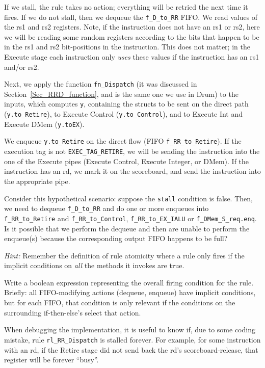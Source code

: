 If we stall, the rule takes no action; everything will be retried the
next time it fires.  If we do not stall, then we dequeue the
\verb|f_D_to_RR| FIFO.  We read values of the rs1 and rs2 registers.
Note, if the instruction does not have an rs1 or rs2, here we will be
reading some random registers according to the bits that happen to be
in the rs1 and rs2 bit-positions in the instruction.  This does not
matter; in the Execute stage each instruction only \emph{uses} these
values if the instruction has an rs1 and/or rs2.

Next, we apply the function \verb|fn_Dispatch| (it was discussed in
Section~\ref{Sec_RRD_function}, and is the same one we use in Drum) to
the inputs, which computes \verb|y|, containing the structs to be sent
on the direct path (\verb|y.to_Retire|), to Execute Control
(\verb|y.to_Control|), and to Execute Int and Execute DMem
(\verb|y.toEX|).

We enqueue \verb|y.to_Retire| on the direct flow (FIFO
\verb|f_RR_to_Retire|).  If the execution tag is not
\verb|EXEC_TAG_RETIRE|, we will be sending the instruction into the
one of the Execute pipes (Execute Control, Execute Integer, or DMem).
If the instruction has an rd, we mark it on the scoreboard, and send
the instruction into the appropriate pipe.

\hdivider

\Exercise

Consider this hypothetical scenario: suppose the \verb|stall|
condition is false.  Then, we need to dequeue \verb|f_D_to_RR| and do
one or more enqueues into \verb|f_RR_to_Retire| and
\verb|f_RR_to_Control|, \verb|f_RR_to_EX_IALU| or
\verb|f_DMem_S_req.enq|.  Is it possible that we perform the dequeue
and then are unable to perform the enqueue(s) because the
corresponding output FIFO happens to be full?

\emph{Hint:} Remember the definition of rule atomicity where a rule
only fires if the implicit conditions on \emph{all} the methods it
invokes are true.

\Exercise

Write a boolean expression representing the overall firing condition
for the rule.  Briefly: all FIFO-modifying actions (dequeue, enqueue)
have implicit conditions, but for each FIFO, that condition is only
relevant if the conditions on the surrounding if-then-else's select
that action.

\Exercise

When debugging the implementation, it is useful to know if, due to
some coding mistake, rule \verb|rl_RR_Dispatch| is stalled forever.
For example, for some instruction with an rd, if the Retire stage did
not send back the rd's scoreboard-release, that register will be
forever ``busy''.

